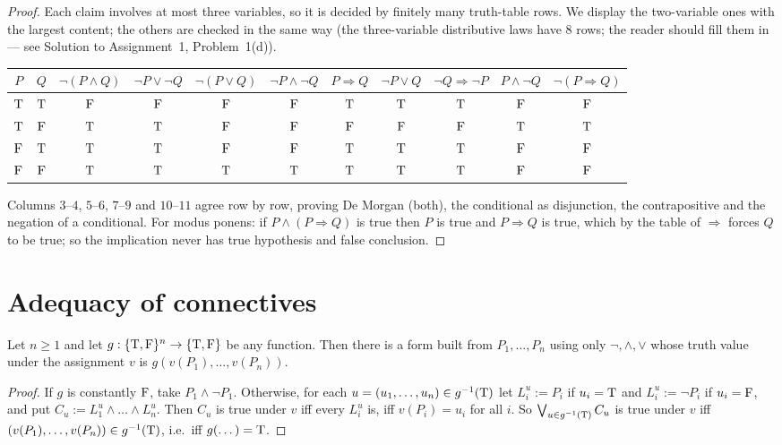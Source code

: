 \begin{proof}
	Each claim involves at most three variables, so it is decided by finitely many truth-table rows. We display the two-variable ones with the largest content; the others are checked in the same way (the three-variable distributive laws have $8$ rows; the reader should fill them in --- see Solution to Assignment~1, Problem~1(d)).
	\begin{center}\scriptsize\setlength{\tabcolsep}{3pt}
		\begin{tabular}{cc|cc|cc|ccc|cc}
			$P$&$Q$&$\neg(P\wedge Q)$&$\neg P\vee\neg Q$&$\neg(P\vee Q)$&$\neg P\wedge\neg Q$&$P\Rightarrow Q$&$\neg P\vee Q$&$\neg Q\Rightarrow\neg P$&$P\wedge\neg Q$&$\neg(P\Rightarrow Q)$\\ \midrule
			$\mathrm{T}$&$\mathrm{T}$&$\mathrm{F}$&$\mathrm{F}$&$\mathrm{F}$&$\mathrm{F}$&$\mathrm{T}$&$\mathrm{T}$&$\mathrm{T}$&$\mathrm{F}$&$\mathrm{F}$\\
			$\mathrm{T}$&$\mathrm{F}$&$\mathrm{T}$&$\mathrm{T}$&$\mathrm{F}$&$\mathrm{F}$&$\mathrm{F}$&$\mathrm{F}$&$\mathrm{F}$&$\mathrm{T}$&$\mathrm{T}$\\
			$\mathrm{F}$&$\mathrm{T}$&$\mathrm{T}$&$\mathrm{T}$&$\mathrm{F}$&$\mathrm{F}$&$\mathrm{T}$&$\mathrm{T}$&$\mathrm{T}$&$\mathrm{F}$&$\mathrm{F}$\\
			$\mathrm{F}$&$\mathrm{F}$&$\mathrm{T}$&$\mathrm{T}$&$\mathrm{T}$&$\mathrm{T}$&$\mathrm{T}$&$\mathrm{T}$&$\mathrm{T}$&$\mathrm{F}$&$\mathrm{F}$
		\end{tabular}
	\end{center}
	Columns $3$--$4$, $5$--$6$, $7$--$9$ and $10$--$11$ agree row by row, proving De Morgan (both), the conditional as disjunction, the contrapositive and the negation of a conditional. For modus ponens: if $P\wedge(P\Rightarrow Q)$ is true then $P$ is true and $P\Rightarrow Q$ is true, which by the table of $\Rightarrow$ forces $Q$ to be true; so the implication never has true hypothesis and false conclusion.
\end{proof}

\section{Adequacy of connectives}

\begin{theorem}\label{thm:adequacy}
	Let $n\ge1$ and let $g:\{\mathrm{T},\mathrm{F}\}^n\to\{\mathrm{T},\mathrm{F}\}$ be any function. Then there is a form built from $P_1,\dots,P_n$ using only $\neg,\wedge,\vee$ whose truth value under the assignment $v$ is $g(v(P_1),\dots,v(P_n))$.
\end{theorem}
\begin{proof}
	If $g$ is constantly $\mathrm{F}$, take $P_1\wedge\neg P_1$. Otherwise, for each $u=(u_1,\dots,u_n)\in g^{-1}(\mathrm{T})$ let $L_i^u:=P_i$ if $u_i=\mathrm{T}$ and $L_i^u:=\neg P_i$ if $u_i=\mathrm{F}$, and put $C_u:=L_1^u\wedge\dots\wedge L_n^u$. Then $C_u$ is true under $v$ iff every $L_i^u$ is, iff $v(P_i)=u_i$ for all $i$. So $\bigvee_{u\in g^{-1}(\mathrm{T})}C_u$ is true under $v$ iff $(v(P_1),\dots,v(P_n))\in g^{-1}(\mathrm{T})$, i.e.\ iff $g(\dots)=\mathrm{T}$.
\end{proof}


